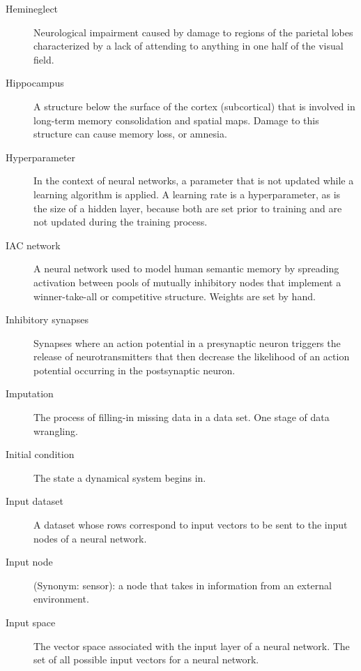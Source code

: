 \begin{description}
\item[Hemineglect] Neurological impairment caused by damage to regions of the parietal lobes characterized by a lack of attending to anything in one half of the visual field.

\item[Hippocampus] A structure below the surface of the cortex (subcortical) that is involved in long-term memory consolidation and spatial maps. Damage to this structure can cause memory loss, or amnesia. 


\item[Hyperparameter] In the context of neural networks, a parameter that is not updated while a learning algorithm is applied. A learning rate is a hyperparameter, as is the size of a hidden layer, because both are set prior to training and are not updated during the training process.

\item[IAC network] A neural network used to model human semantic memory by spreading activation between pools of mutually inhibitory nodes that implement a winner-take-all or competitive structure. Weights are set by hand. 

\item[Inhibitory synapses] Synapses where an action potential in a presynaptic neuron triggers the release of neurotransmitters that then decrease the likelihood of an action potential occurring in the postsynaptic neuron.

\item[Imputation] The process of filling-in missing data in a data set. One stage of data wrangling.

\item[Initial condition] The state a dynamical system begins in.

\item[Input dataset] A dataset whose rows correspond to input vectors to be sent to the input nodes of a neural network.

\item[Input node] (Synonym: sensor): a node that takes in information from an external environment. 

\item[Input space] The vector space associated with the input layer of a neural network. The set of all possible input vectors for a neural network.



\end{description}
